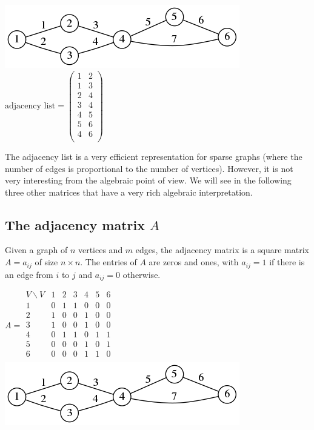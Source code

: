 \includegraphics{graph2.png}
$
	\textrm{adjacency list} =
	\begin{pmatrix}
		1 & 2 \\
		1 & 3 \\
		2 & 4 \\
		3 & 4 \\
		4 & 5 \\
		5 & 6 \\
		4 & 6 \\
	\end{pmatrix}
$


The adjacency list is a very efficient representation for sparse graphs (where
the number of edges is proportional to the number of vertices).
However, it is not very interesting from the algebraic point of view.
We will see in the following three other matrices that have a very rich
algebraic interpretation.


\subsection{The adjacency matrix $A$}


Given a graph of $n$ vertices and $m$ edges,
the adjacency matrix is a square matrix $A=a_{ij}$ of size $n\times n$.
The entries of $A$ are zeros and ones, with $a_{ij}=1$ if there is an edge
from $i$ to $j$ and $a_{ij}=0$ otherwise.

$
A =
\begin{array}{l|lllllll}
	V\backslash V
	  & 1 & 2 & 3 & 4 & 5 & 6 \\
	\hline
	1 & 0 & 1 & 1 & 0 & 0 & 0 \\
	2 & 1 & 0 & 0 & 1 & 0 & 0 \\
	3 & 1 & 0 & 0 & 1 & 0 & 0 \\
	4 & 0 & 1 & 1 & 0 & 1 & 1 \\
	5 & 0 & 0 & 0 & 1 & 0 & 1 \\
	6 & 0 & 0 & 0 & 1 & 1 & 0 \\
\end{array}
$
\includegraphics{graph2.png}

